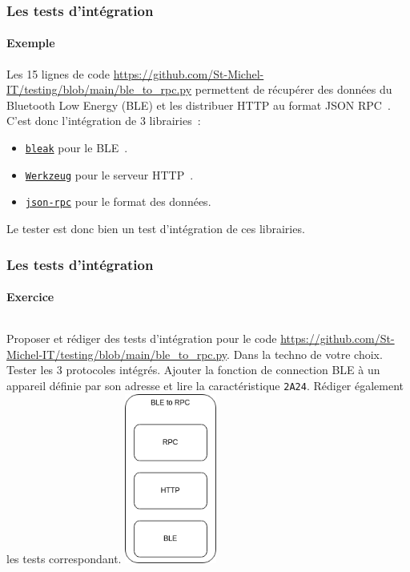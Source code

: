 \documentclass{beamer}
\begin{document}
    \begin{frame}
        \transdissolve
        \frametitle{Les tests d'intégration}
        \framesubtitle{Exemple}

        Les 15 lignes de code \url{https://github.com/St-Michel-IT/testing/blob/main/ble_to_rpc.py} permettent de récupérer des données du Bluetooth Low Energy (BLE) et les distribuer  HTTP au format JSON RPC~.
        \bigbreak
        C'est donc l'intégration de 3 librairies~:
        \begin{itemize}
            \item \href{https://bleak.readthedocs.io/en/latest/index.html}{\lstinline{bleak}} pour le BLE~.
            \item \href{https://werkzeug.palletsprojects.com/en/3.0.x/}{\lstinline{Werkzeug}} pour le serveur HTTP~.
            \item \href{https://github.com/pavlov99/json-rpc}{\lstinline{json-rpc}} pour le format des données.
        \end{itemize}
        \bigbreak
        Le tester est donc bien un test d'intégration de ces librairies.
    \end{frame}

    \begin{frame}
        \transdissolve
        \frametitle{Les tests d'intégration}
        \framesubtitle{Exercice \execcounterdispinc{}}
        \begin{columns}
            Proposer et rédiger des tests d'intégration pour le code \url{https://github.com/St-Michel-IT/testing/blob/main/ble_to_rpc.py}.
            Dans la techno de votre choix.
            \bigbreak
            Tester les 3 protocoles intégrés.
            \bigbreak
            Ajouter la fonction de connection BLE à un appareil définie par son adresse et lire la caractéristique  \lstinline{2A24}.
            Rédiger également les tests correspondant.
            \centering
            \includegraphics[width=3cm]{image/ble-2-rpc-stack.drawio}
        \end{columns}
    \end{frame}
\end{document}
